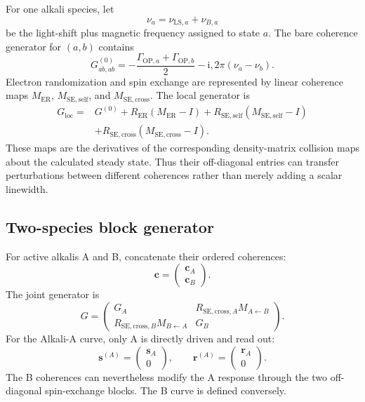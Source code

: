 \documentclass[11pt]{article}
\newcommand{\ii}{\mathrm{i}}
\begin{document}
For one alkali species, let
\begin{equation}
  \nu_a=\nu_{\mathrm{LS},a}+\nu_{B,a}
\end{equation}
be the light-shift plus magnetic frequency assigned to state $a$.  The bare
coherence generator for $(a,b)$ contains
\begin{equation}
  G^{(0)}_{ab,ab}
  =-\frac{\Gamma_{\mathrm{OP},a}+\Gamma_{\mathrm{OP},b}}{2}
   -\ii,2\pi(\nu_a-\nu_b).
  \label{eq:bare-generator}
\end{equation}
Electron randomization and spin exchange are represented by linear coherence
maps $M_{\mathrm{ER}}$, $M_{\mathrm{SE,self}}$, and
$M_{\mathrm{SE,cross}}$.  The local generator is
\begin{align}
  G_{\mathrm{loc}}={}&G^{(0)}
  +R_{\mathrm{ER}}(M_{\mathrm{ER}}-I)
  +R_{\mathrm{SE,self}}(M_{\mathrm{SE,self}}-I)\nonumber\\
  &+R_{\mathrm{SE,cross}}(M_{\mathrm{SE,cross}}-I).
  \label{eq:local-generator}
\end{align}
These maps are the derivatives of the corresponding density-matrix collision
maps about the calculated steady state.  Thus their off-diagonal entries can
transfer perturbations between different coherences rather than merely adding
a scalar linewidth.

\subsection{Two-species block generator}

For active alkalis A and B, concatenate their ordered coherences:
\begin{equation}
  \bm c=\begin{pmatrix}\bm c_A\\\bm c_B\end{pmatrix}.
\end{equation}
The joint generator is
\begin{equation}
  G=\begin{pmatrix}
  G_A & R_{\mathrm{SE,cross},A}M_{A\leftarrow B}\\
  R_{\mathrm{SE,cross},B}M_{B\leftarrow A} & G_B
  \end{pmatrix}.
  \label{eq:block-generator}
\end{equation}
For the Alkali-A curve, only A is directly driven and read out:
\begin{equation}
  \bm s^{(A)}=\begin{pmatrix}\bm s_A\\0\end{pmatrix},
  \qquad
  \bm r^{(A)}=\begin{pmatrix}\bm r_A\\0\end{pmatrix}.
\end{equation}
The B coherences can nevertheless modify the A response through the two
off-diagonal spin-exchange blocks.  The B curve is defined conversely.
\end{document}
